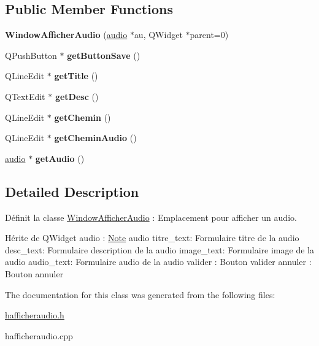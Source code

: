 \subsection*{Public Member Functions}
\begin{DoxyCompactItemize}
\item 
\mbox{\label{class_window_afficher_audio_a95cd6d56b939154f985c7871b2762533}} 
{\bfseries Window\+Afficher\+Audio} (\hyperlink{classaudio}{audio} $\ast$au, Q\+Widget $\ast$parent=0)
\item 
\mbox{\label{class_window_afficher_audio_aea896e4f759330de7d28e7c244333a0c}} 
Q\+Push\+Button $\ast$ {\bfseries get\+Button\+Save} ()
\item 
\mbox{\label{class_window_afficher_audio_a580ed7bcb6fff41ce8d44d247d6bfe55}} 
Q\+Line\+Edit $\ast$ {\bfseries get\+Title} ()
\item 
\mbox{\label{class_window_afficher_audio_a04ed86b67f5ca3fb98a052d3201942ab}} 
Q\+Text\+Edit $\ast$ {\bfseries get\+Desc} ()
\item 
\mbox{\label{class_window_afficher_audio_abbfcec61167e06a68e7d9d2109c5c1fd}} 
Q\+Line\+Edit $\ast$ {\bfseries get\+Chemin} ()
\item 
\mbox{\label{class_window_afficher_audio_ae0ff73dae1ca9c4c5ab644a75cb8e100}} 
Q\+Line\+Edit $\ast$ {\bfseries get\+Chemin\+Audio} ()
\item 
\mbox{\label{class_window_afficher_audio_a082597915a6d0d5fca04c288678725a1}} 
\hyperlink{classaudio}{audio} $\ast$ {\bfseries get\+Audio} ()
\end{DoxyCompactItemize}


\subsection{Detailed Description}
Définit la classe \hyperlink{class_window_afficher_audio}{Window\+Afficher\+Audio} \+: Emplacement pour afficher un audio. 

Hérite de Q\+Widget audio \+: \hyperlink{class_note}{Note} audio titre\+\_\+text\+: Formulaire titre de la audio desc\+\_\+text\+: Formulaire description de la audio image\+\_\+text\+: Formulaire image de la audio audio\+\_\+text\+: Formulaire audio de la audio valider \+: Bouton valider annuler \+: Bouton annuler 

The documentation for this class was generated from the following files\+:\begin{DoxyCompactItemize}
\item 
\hyperlink{hafficheraudio_8h}{hafficheraudio.\+h}\item 
hafficheraudio.\+cpp\end{DoxyCompactItemize}
